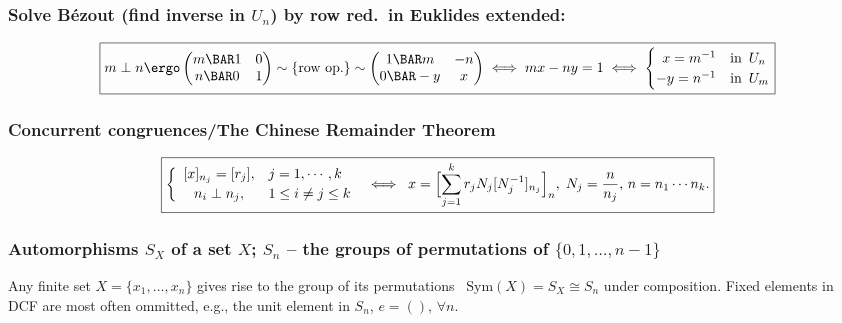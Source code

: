 \documentclass[a4paper]{article}
\begin{document}
\subsubsection*{Solve Bézout  (find inverse in $U_n$) %
by row red.~in Euklides extended:}
\[
  \boxed{
  m\perp n \ergo
  \begin{pmatrix}
    m \BAR 1 & 0 \cr
    n \BAR 0 & 1 \cr
  \end{pmatrix}
  \sim \{\mbox{row op.}\} \sim
  \begin{pmatrix}
    1 \BAR m & -n \cr
    0 \BAR -y & x \cr
  \end{pmatrix}
  \iff
  mx-ny=1
  \iff
  \begin{cases}
  \hfill  x = m^{-1}   & \text{in }\, U_n \cr
   -y = n^{-1} & \text{in }\, U_m \cr
  \end{cases}
}
\]%

\subsubsection*{Concurrent congruences/The Chinese Remainder Theorem}%
\[
  \boxed{
  \left\{
  \begin{array}{ll}
    [x]_{n_j} = [r_j],& j=1,\cdots,k \\[2pt]
  \hfil n_i\perp n_j ,& 1\le i\neq j\le k
  \end{array}\right.
\;\iff\;
x = \Bigl[ \sum_{j=1}^{k} r_jN_j[N_j^{-1}]_{n_j} \Bigr]_n, \; N_j= \frac{n}{n_j}, \,
    n=n_1\cdots n_k.
  }
\]%

\subsubsection*{Automorphisms $S_X$ of a set $X$; $S_n$ %
  -- the groups of permutations of $\{0,1,\ldots,n-1\}$}


Any finite set $X=\{x_1,\ldots,x_n\}$ gives rise to the group of its
permutations \, $\text{Sym}(X)=S_X\cong S_n$ under composition.
Fixed elements in DCF are most often ommitted, e.g., the unit element in $S_n$, $e=()$, $\forall n$.
\end{document}
